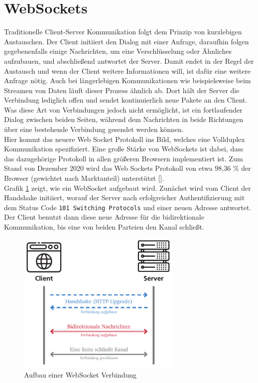 \section{WebSockets}
\label{sec:websockets}

Traditionelle Client-Server Kommunikation folgt dem Prinzip von kurzlebigen Austauschen. Der Client initiiert den Dialog mit einer Anfrage, daraufhin folgen gegebenenfalls einige Nachrichten, um eine Verschlüsselung oder Ähnliches aufzubauen, und abschließend antwortet der Server. Damit endet in der Regel der Austausch und wenn der Client weitere Informationen will, ist dafür eine weitere Anfrage nötig. Auch bei längerlebigen Kommunikationen wie beispielsweise beim Streamen von Daten läuft dieser Prozess ähnlich ab. Dort hält der Server die Verbindung lediglich offen und sendet kontinuierlich neue Pakete an den Client. Was diese Art von Verbindungen jedoch nicht ermöglicht, ist ein fortlaufender Dialog zwischen beiden Seiten, während dem Nachrichten in beide Richtungen über eine bestehende Verbindung gesendet werden können.\\
Hier kommt das neuere Web Socket Protokoll ins Bild, welches eine Vollduplex Kommunikation spezifiziert. Eine große Stärke von WebSockets ist dabei, dass das dazugehörige Protokoll in allen größeren Browsern implementiert ist. Zum Stand von Dezember 2020 wird das Web Sockets Protokoll von etwa 98,36 \% der Browser (gewichtet nach Marktanteil) unterstützt [\cite{webSocketBrowser}].\\
Grafik \ref{fig:WebSocket} zeigt, wie ein WebSocket aufgebaut wird. Zunächst wird vom Client der Handshake initiiert, worauf der Server nach erfolgreicher Authentifizierung mit dem Status Code \verb|101 Switching Protocols| und einer neuen Adresse antwortet. Der Client benutzt dann diese neue Adresse für die bidirektionale Kommunikation, bis eine von beiden Parteien den Kanal schließt.

\begin{figure}[htbp]
	\centering\includegraphics[width=0.7\textwidth]{images/03/WebSocket.pdf}
    \caption{Aufbau einer WebSocket Verbindung}
    \label{fig:WebSocket}
\end{figure}

